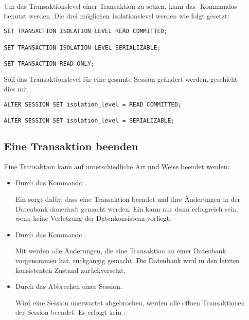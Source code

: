         Um das Transaktionslevel einer Transaktion zu setzen, kann das
        -Kommandos benutzt
        werden. Die drei m\"oglichen Isolationslevel werden wie folgt gesetzt:
        \begin{lstlisting}[caption={Isolationslevel einer Transaktion
        w\"ahlen},label=admin401,language=oracle_sql]
SET TRANSACTION ISOLATION LEVEL READ COMMITTED;

SET TRANSACTION ISOLATION LEVEL SERIALIZABLE;

SET TRANSACTION READ ONLY;
        \end{lstlisting}
        Soll das Transaktionslevel für eine gesamte Session geändert werden,
        geschieht dies mit .
\clearpage
        \begin{lstlisting}[caption={Isolationslevel einer Session w\"ahlen},label=admin402,language=oracle_sql]
ALTER SESSION SET isolation_level = READ COMMITTED;

ALTER SESSION SET isolation_level = SERIALIZABLE;
        \end{lstlisting}
      \subsection{Eine Transaktion beenden}
        Eine Transaktion kann auf unterschiedliche Art und Weise beendet werden:
        \begin{itemize}
          \item Durch das Kommando .

          Ein  sorgt daf\"ur, dass eine Transaktion beendet und ihre \"Anderungen in der Datenbank dauerhaft gemacht werden. Ein  kann nur dann erfolgreich sein, wenn keine Verletzung der Datenkonsistenz vorliegt.
          \item Durch das Kommando .

          Mit  werden alle \"Anderungen, die eine Transaktion an einer Datenbank vorgenommen hat, r\"uckg\"angig gemacht. Die Datenbank wird in den letzten konsistenten Zustand zur\"uckversetzt.
          \item Durch das Abbrechen einer Session.

          Wird eine Session unerwartet abgebrochen, werden alle offnen Transaktionen der Session beendet. Es erfolgt kein .
        \end{itemize}
